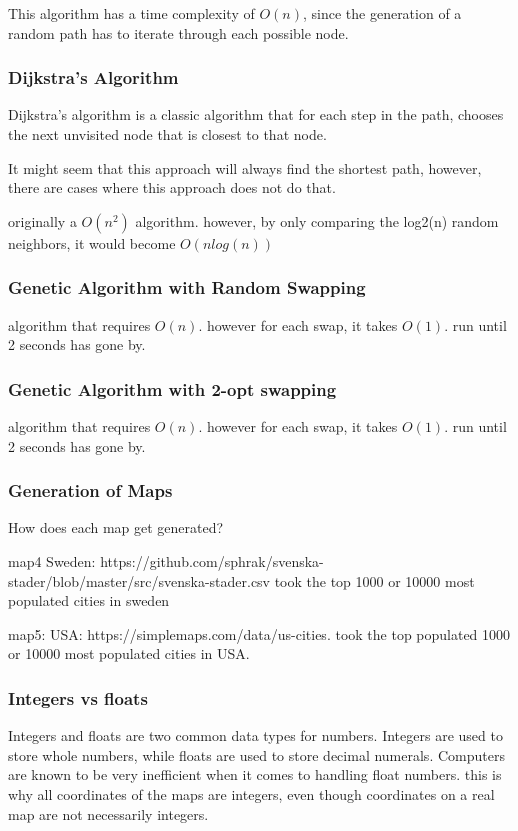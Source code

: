 \documentclass{article}
\begin{document}
\noindent
This algorithm has a time complexity of $O(n)$, since the generation of a random path has to iterate through each possible node. 

\subsubsection{Dijkstra's Algorithm}\label{Dijkstras}
Dijkstra's algorithm is a classic algorithm that for each step in the path, chooses the next unvisited node that is closest to that node. 

It might seem that this approach will always find the shortest path, however, there are cases where this approach does not do that. 




originally a $O(n^2)$ algorithm. however, by only comparing the log2(n) random neighbors, it would become $O(nlog(n))$

\subsubsection{Genetic Algorithm with Random Swapping}\label{Random Swapping}
algorithm that requires $O(n)$. however for each swap, it takes $O(1)$. run until 2 seconds has gone by.

\subsubsection{Genetic Algorithm with 2-opt swapping}\label{2-opt swapping}
algorithm that requires $O(n)$. however for each swap, it takes $O(1)$. run until 2 seconds has gone by.

\subsubsection{Generation of Maps}\label{subsubsec1}
How does each map get generated?

map4 Sweden: https://github.com/sphrak/svenska-stader/blob/master/src/svenska-stader.csv  took the top 1000 or 10000 most populated cities in sweden

map5: USA: https://simplemaps.com/data/us-cities. took the top populated 1000 or 10000 most populated cities in USA.

\subsubsection{Integers vs floats}\label{subsubsec1}
Integers and floats are two common data types for numbers. Integers are used to store whole numbers, while floats are used to store decimal numerals. Computers are known to be very inefficient when it comes to handling float numbers.
this is why all coordinates of the maps are integers, even though coordinates on a real map are not necessarily integers. 
\end{document}
